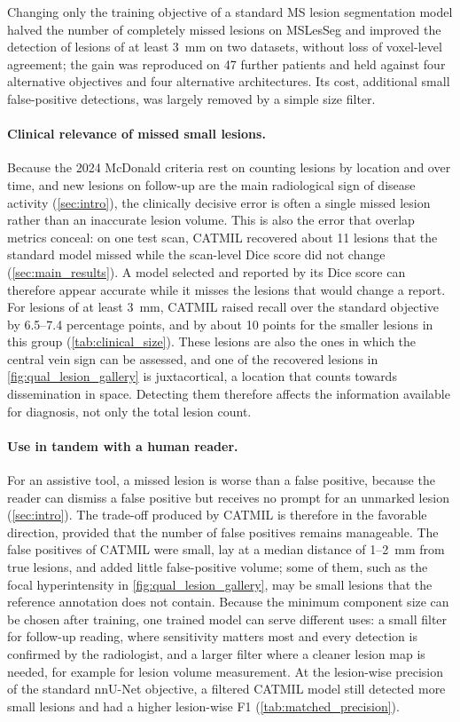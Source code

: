 Changing only the training objective of a standard MS lesion segmentation
model halved the number of completely missed lesions on MSLesSeg and
improved the detection of lesions of at least 3~mm on two datasets, without
loss of voxel-level agreement; the gain was reproduced on 47 further
patients and held against four alternative objectives and four alternative
architectures. Its cost, additional small false-positive detections, was
largely removed by a simple size filter.

\paragraph{Clinical relevance of missed small lesions.}
Because the 2024 McDonald criteria rest on counting lesions by location and
over time, and new lesions on follow-up are the main radiological sign of
disease activity (\cref{sec:intro}), the clinically decisive error is often
a single missed lesion rather than an inaccurate lesion volume. This is
also the error that overlap metrics conceal: on one test scan, CATMIL
recovered about 11 lesions that the standard model missed while the
scan-level Dice score did not change (\cref{sec:main_results}). A model
selected and reported by its Dice score can therefore appear accurate while
it misses the lesions that would change a report. For lesions of at least
3~mm, CATMIL raised recall over the standard objective by 6.5--7.4
percentage points, and by about 10 points for the smaller lesions in this
group (\cref{tab:clinical_size}). These lesions are also the ones in which
the central vein sign can be assessed, and one of the recovered lesions in
\cref{fig:qual_lesion_gallery} is juxtacortical, a location that counts
towards dissemination in space. Detecting them therefore affects the
information available for diagnosis, not only the total lesion count.

\paragraph{Use in tandem with a human reader.}
For an assistive tool, a missed lesion is worse than a false positive,
because the reader can dismiss a false positive but receives no prompt for
an unmarked lesion (\cref{sec:intro}). The trade-off produced by CATMIL is
therefore in the favorable direction, provided that the number of false
positives remains manageable. The false positives of CATMIL were small,
lay at a median distance of 1--2~mm from true lesions, and added little
false-positive volume; some of them, such as the focal hyperintensity in
\cref{fig:qual_lesion_gallery}, may be small lesions that the reference
annotation does not contain. Because the minimum component size can be
chosen after training, one trained model can serve different uses: a small
filter for follow-up reading, where sensitivity matters most and every
detection is confirmed by the radiologist, and a larger filter where a
cleaner lesion map is needed, for example for lesion volume measurement.
At the lesion-wise precision of the standard nnU-Net objective, a filtered
CATMIL model still detected more small lesions and had a higher lesion-wise
F1 (\cref{tab:matched_precision}).

